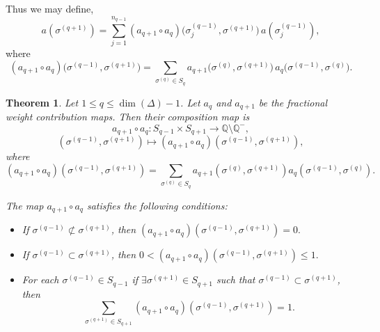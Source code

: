 \documentclass[12pt]{article}
\theoremstyle{normalhead_nobrackets}
\newtheorem{theorem}{Theorem}[section]
\theoremstyle{exampstyle}
\begin{document}
Thus we may define,
\[
a(\sigma^{(q+1)}) =
\sum_{j=1}^{n_{q-1}}
(a_{q+1} \circ a_q)\bigl(\sigma_j^{(q-1)}, \sigma^{(q+1)}\bigr)
\, a(\sigma_j^{(q-1)}),
\]
where
\[
(a_{q+1} \circ a_q)\bigl(\sigma^{(q-1)}, \sigma^{(q+1)}\bigr)
=
\sum_{\sigma^{(q)} \in S_q}
a_{q+1}\bigl(\sigma^{(q)}, \sigma^{(q+1)}\bigr)
\, a_q\bigl(\sigma^{(q-1)}, \sigma^{(q)}\bigr).
\]



\begin{theorem}
Let $1 \le q \le \dim(\Delta)-1$. 
Let $a_q$ and $a_{q+1}$ be the fractional weight contribution maps. 
Then their composition map is
\[
a_{q+1} \circ a_q : S_{q-1} \times S_{q+1} 
\longrightarrow \mathbb{Q} \setminus \mathbb{Q}^-,
\]
\[
(\sigma^{(q-1)}, \sigma^{(q+1)}) 
\longmapsto 
(a_{q+1} \circ a_q)(\sigma^{(q-1)}, \sigma^{(q+1)}),
\]
where
\[
(a_{q+1} \circ a_q)(\sigma^{(q-1)}, \sigma^{(q+1)})
=
\sum_{\sigma^{(q)} \in S_q}
a_{q+1}(\sigma^{(q)}, \sigma^{(q+1)})
a_q(\sigma^{(q-1)}, \sigma^{(q)}).
\]

The map $a_{q+1} \circ a_q$ satisfies the following conditions:

\begin{itemize}
    \item[(i)] If $\sigma^{(q-1)} \not\subset \sigma^{(q+1)}$, then
    \(
    (a_{q+1} \circ a_q)(\sigma^{(q-1)}, \sigma^{(q+1)}) = 0.
    \)

    \item[(ii)] If $\sigma^{(q-1)} \subset \sigma^{(q+1)}$, then
    \(
    0 < (a_{q+1} \circ a_q)(\sigma^{(q-1)}, \sigma^{(q+1)}) \le 1.
    \)

    \item[(iii)] For each $\sigma^{(q-1)} \in S_{q-1}$ if $\exists \sigma^{(q+1)} \in S_{q+1}$ such that $\sigma^{(q-1)} \subset \sigma^{(q+1)}$, then
    \[
    \sum_{\sigma^{(q+1)} \in S_{q+1}}
    (a_{q+1} \circ a_q)(\sigma^{(q-1)}, \sigma^{(q+1)}) = 1.
    \]
\end{itemize}
\end{theorem}
\end{document}

